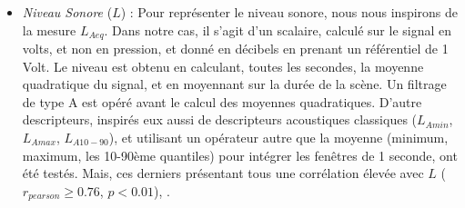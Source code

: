 \begin{itemize}
\begin{itemize}
\item \emph{Niveau Sonore} ($L$) : Pour représenter le niveau sonore, nous nous inspirons de la mesure $L_{Aeq}$. Dans notre cas, il s'agit d'un scalaire, calculé sur le signal en volts, et non en pression, et donné en décibels en prenant un référentiel de 1 Volt. Le niveau est obtenu en calculant, toutes les secondes, la moyenne quadratique du signal, et en moyennant sur la durée de la scène. Un filtrage de type A est opéré avant le calcul des moyennes quadratiques. D'autre descripteurs, inspirés eux aussi de descripteurs acoustiques classiques ($L_{Amin}$, $L_{Amax}$, $L_{A10-90}$), et utilisant un opérateur autre que la moyenne (minimum, maximum, les 10-90ème quantiles) pour intégrer les fenêtres de 1 seconde,  ont été testés. Mais, ces derniers présentant tous une corrélation élevée avec $L$ ($r_{pearson}\geq0.76$, $p<0.01$),  .
\end{itemize}
\end{itemize}


